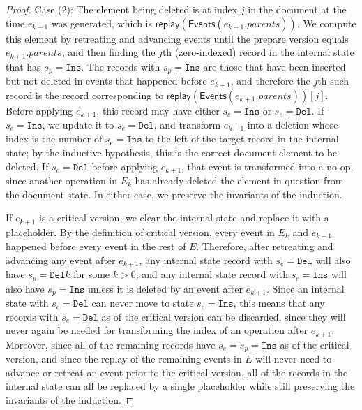 \documentclass[sigplan,10pt]{acmart}
\begin{document}
\begin{proof}
  Case (2): The element being deleted is at index $j$ in the document at the time $e_{k+1}$ was generated, which is $\mathsf{replay}(\mathsf{Events}(e_{k+1}.\mathit{parents}))$.
  We compute this element by retreating and advancing events until the prepare version equals $e_{k+1}.\mathit{parents}$, and then finding the $j$th (zero-indexed) record in the internal state that has $s_p = \texttt{Ins}$.
  The records with $s_p = \texttt{Ins}$ are those that have been inserted but not deleted in events that happened before $e_{k+1}$, and therefore the $j$th such record is the record corresponding to $\mathsf{replay}(\mathsf{Events}(e_{k+1}.\mathit{parents}))[j]$.
  Before applying $e_{k+1}$, this record may have either $s_e = \texttt{Ins}$ or $s_e = \texttt{Del}$.
  If $s_e = \texttt{Ins}$, we update it to $s_e = \texttt{Del}$, and transform $e_{k+1}$ into a deletion whose index is the number of $s_e = \texttt{Ins}$ to the left of the target record in the internal state; by the inductive hypothesis, this is the correct document element to be deleted.
  If $s_e = \texttt{Del}$ before applying $e_{k+1}$, that event is transformed into a no-op, since another operation in $E_k$ has already deleted the element in question from the document state.
  In either case, we preserve the invariants of the induction.

  If $e_{k+1}$ is a critical version, we clear the internal state and replace it with a placeholder.
  By the definition of critical version, every event in $E_k$ and $e_{k+1}$ happened before every event in the rest of $E$.
  Therefore, after retreating and advancing any event after $e_{k+1}$, any internal state record with $s_e = \texttt{Del}$ will also have $s_p = \texttt{Del} k$ for some $k>0$, and any internal state record with $s_e = \texttt{Ins}$ will also have $s_p = \texttt{Ins}$ unless it is deleted by an event after $e_{k+1}$.
  Since an internal state with $s_e = \texttt{Del}$ can never move to state $s_e = \texttt{Ins}$, this means that any records with $s_e = \texttt{Del}$ as of the critical version can be discarded, since they will never again be needed for transforming the index of an operation after $e_{k+1}$.
  Moreover, since all of the remaining records have $s_e = s_p = \texttt{Ins}$ as of the critical version, and since the replay of the remaining events in $E$ will never need to advance or retreat an event prior to the critical version, all of the records in the internal state can all be replaced by a single placeholder while still preserving the invariants of the induction.
\end{proof}
\end{document}
